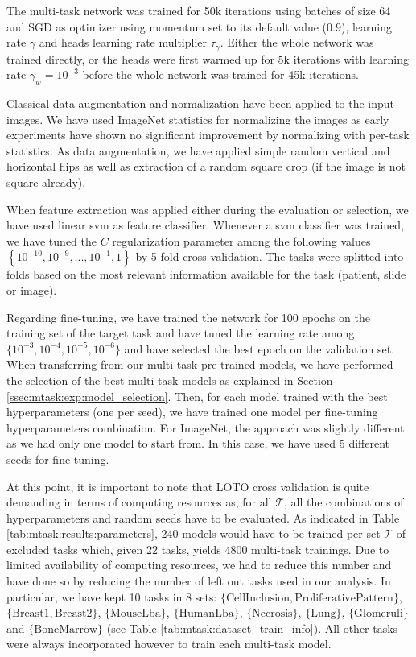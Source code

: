 The multi-task network was trained for 50k iterations using batches of size 64 and SGD as optimizer using momentum set to its default value (\ie $0.9$), learning rate $\gamma$ and heads learning rate multiplier $\tau_\gamma$. Either the whole network was trained directly, or the heads were first warmed up for 5k iterations with learning rate $\gamma_w = 10^{-3}$ before the whole network was trained for 45k iterations.

Classical data augmentation and normalization have been applied to the input images. We have used ImageNet statistics for normalizing the images as early experiments have shown no significant improvement by normalizing with per-task statistics. As data augmentation, we have applied simple random vertical and horizontal flips as well as extraction of a random square crop (if the image is not square already).

When feature extraction was applied either during the evaluation or selection, we have used linear \acrshort{svm} \cite{fan2008liblinear} as feature classifier. Whenever a \acrshort{svm} classifier was trained, we have tuned the $C$ regularization parameter among the following values $\left\{10^{-10}, 10^{-9},...,10^{-1},1\right\}$ by 5-fold cross-validation. The tasks were splitted into folds based on the most relevant information available for the task (patient, slide or image).

Regarding fine-tuning, we have trained the network for 100 epochs on the training set of the target task and have tuned the learning rate among $\{10^{-3}, 10^{-4}, 10^{-5}, 10^{-6}\}$ and have selected the best epoch on the validation set. When transferring from our multi-task pre-trained models, we have performed the selection of the best multi-task models as explained in Section \ref{ssec:mtask:exp:model_selection}. Then, for each model trained with the best hyperparameters (\ie one per seed), we have trained one model per fine-tuning hyperparameters combination. For ImageNet, the approach was slightly different as we had only one model to start from. In this case, we have used 5 different seeds for fine-tuning. 

At this point, it is important to note that LOTO cross validation is quite demanding in terms of computing resources as, for all $\mathcal{T}$, all the combinations of hyperparameters and random seeds have to be evaluated. As indicated in Table \ref{tab:mtask:results:parameters}, 240 models would have to be trained per set $\mathcal{T}$ of excluded tasks which, given 22 tasks, yields 4800 multi-task trainings. Due to limited availability of computing resources, we had to reduce this number and have done so by reducing the number of left out tasks used in our analysis. In particular, we have kept 10 tasks in 8 sets: $\{\text{CellInclusion}, \text{ProliferativePattern}\}$, $\{\text{Breast1}, \text{Breast2}\}$, $\{\text{MouseLba}\}$, $\{\text{HumanLba}\}$, $\{\text{Necrosis}\}$, $\{\text{Lung}\}$, $\{\text{Glomeruli}\}$ and $\{\text{BoneMarrow}\}$ (see Table \ref{tab:mtask:dataset_train_info}). All other tasks were always incorporated however to train each multi-task model.

